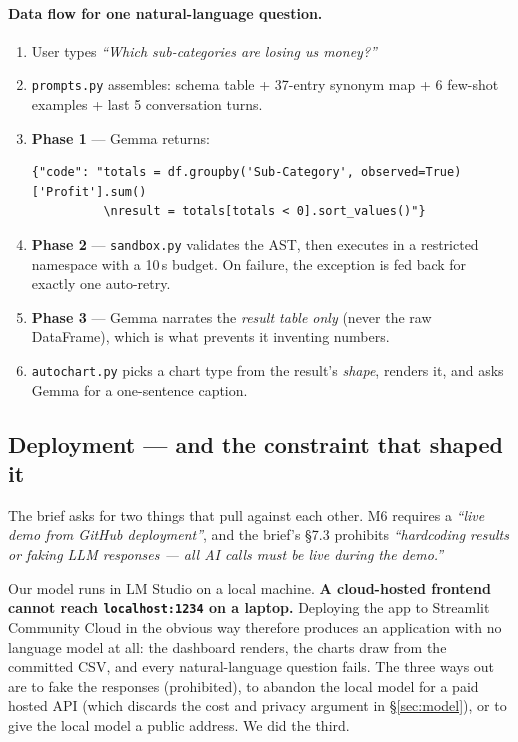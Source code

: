 \documentclass[11pt,a4paper]{article}
\begin{document}
\paragraph{Data flow for one natural-language question.}
\begin{enumerate}[leftmargin=*]
\item User types \emph{``Which sub-categories are losing us money?''}
\item \texttt{prompts.py} assembles: schema table + 37-entry synonym map + 6 few-shot
      examples + last 5 conversation turns.
\item \textbf{Phase 1} --- Gemma returns:
\begin{lstlisting}
{"code": "totals = df.groupby('Sub-Category', observed=True)['Profit'].sum()
          \nresult = totals[totals < 0].sort_values()"}
\end{lstlisting}
\item \textbf{Phase 2} --- \texttt{sandbox.py} validates the AST, then executes in a
      restricted namespace with a 10\,s budget. On failure, the exception is fed back
      for exactly one auto-retry.
\item \textbf{Phase 3} --- Gemma narrates the \emph{result table only} (never the raw
      DataFrame), which is what prevents it inventing numbers.
\item \texttt{autochart.py} picks a chart type from the result's \emph{shape},
      renders it, and asks Gemma for a one-sentence caption.
\end{enumerate}

\subsection{Deployment --- and the constraint that shaped it}
\label{sec:deploy}

The brief asks for two things that pull against each other. M6 requires a \emph{``live
demo from GitHub deployment''}, and the brief's \S7.3 prohibits \emph{``hardcoding results or
faking LLM responses --- all AI calls must be live during the demo.''}

Our model runs in LM Studio on a local machine. \textbf{A cloud-hosted frontend cannot
reach \texttt{localhost:1234} on a laptop.} Deploying the app to Streamlit Community
Cloud in the obvious way therefore produces an application with no language model at
all: the dashboard renders, the charts draw from the committed CSV, and every
natural-language question fails. The three ways out are to fake the responses
(prohibited), to abandon the local model for a paid hosted API (which discards the
cost and privacy argument in \S\ref{sec:model}), or to give the local model a public
address. We did the third.
\end{document}
